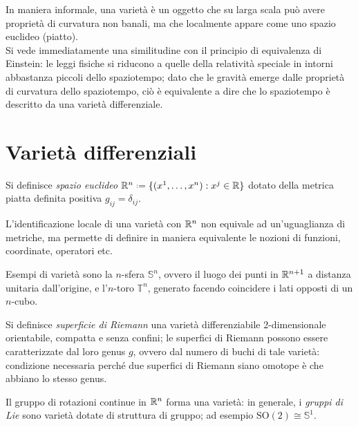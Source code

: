 
In maniera informale, una varietà è un oggetto che su larga scala può avere proprietà di curvatura non banali, ma che localmente appare come uno spazio euclideo (piatto).\\
Si vede immediatamente una similitudine con il principio di equivalenza di Einstein: le leggi fisiche si riducono a quelle della relatività speciale in intorni abbastanza piccoli dello spaziotempo; dato che le gravità emerge dalle proprietà di curvatura dello spaziotempo, ciò è equivalente a dire che lo spaziotempo è descritto da una varietà differenziale.

\section{Varietà differenziali}

\begin{definition}
	Si definisce \textit{spazio euclideo} $ \R^n \defeq \{(x^1,\dots,x^n) : x^j \in \R\} $ dotato della metrica piatta definita positiva $ g_{ij} = \delta_{ij} $.
\end{definition}

L'identificazione locale di una varietà con $ \mathbb{R}^n $ non equivale ad un'uguaglianza di metriche, ma permette di definire in maniera equivalente le nozioni di funzioni, coordinate, operatori etc.

\begin{example}
	Esempi di varietà sono la $ n $-sfera $ \mathbb{S}^n $, ovvero il luogo dei punti in $ \mathbb{R}^{n+1} $ a distanza unitaria dall'origine, e l'$ n $-toro $ \mathbb{T}^n $, generato facendo coincidere i lati opposti di un $ n $-cubo.
\end{example}
\begin{example}
	Si definisce \textit{superficie di Riemann} una varietà differenziabile 2-dimensionale orientabile, compatta e senza confini; le superfici di Riemann possono essere caratterizzate dal loro genus $ g $, ovvero dal numero di buchi di tale varietà: condizione necessaria perché due superfici di Riemann siano omotope è che abbiano lo stesso genus.
\end{example}
\begin{example}
	Il gruppo di rotazioni continue in $ \mathbb{R}^n $ forma una varietà: in generale, i \textit{gruppi di Lie} sono varietà dotate di struttura di gruppo; ad esempio $ \text{SO}(2) \cong \mathbb{S}^1 $.
\end{example}

